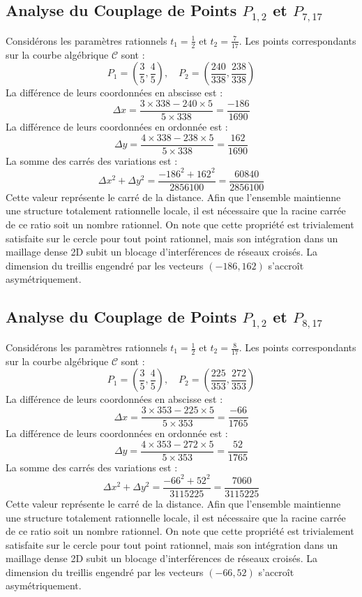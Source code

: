 \documentclass[12pt, a4paper]{article}
\begin{document}
\subsection{Analyse du Couplage de Points $P_{1,2}$ et $P_{7,17}$}
Considérons les paramètres rationnels $t_1 = \frac{1}{2}$ et $t_2 = \frac{7}{17}$.
Les points correspondants sur la courbe algébrique $\mathcal{C}$ sont :
$$ P_1 = \left( \frac{3}{5}, \frac{4}{5} \right), \quad P_2 = \left( \frac{240}{338}, \frac{238}{338} \right) $$
La différence de leurs coordonnées en abscisse est :
$$ \Delta x = \frac{3 \times 338 - 240 \times 5}{5 \times 338} = \frac{-186}{1690} $$
La différence de leurs coordonnées en ordonnée est :
$$ \Delta y = \frac{4 \times 338 - 238 \times 5}{5 \times 338} = \frac{162}{1690} $$
La somme des carrés des variations est :
$$ \Delta x^2 + \Delta y^2 = \frac{ -186^2 + 162^2 }{ 2856100 } = \frac{ 60840 }{ 2856100 } $$
Cette valeur représente le carré de la distance. Afin que l'ensemble maintienne une structure totalement rationnelle locale, il est nécessaire que la racine carrée de ce ratio soit un nombre rationnel. On note que cette propriété est trivialement satisfaite sur le cercle pour tout point rationnel, mais son intégration dans un maillage dense 2D subit un blocage d'interférences de réseaux croisés. La dimension du treillis engendré par les vecteurs $( -186, 162 )$ s'accroît asymétriquement.


\subsection{Analyse du Couplage de Points $P_{1,2}$ et $P_{8,17}$}
Considérons les paramètres rationnels $t_1 = \frac{1}{2}$ et $t_2 = \frac{8}{17}$.
Les points correspondants sur la courbe algébrique $\mathcal{C}$ sont :
$$ P_1 = \left( \frac{3}{5}, \frac{4}{5} \right), \quad P_2 = \left( \frac{225}{353}, \frac{272}{353} \right) $$
La différence de leurs coordonnées en abscisse est :
$$ \Delta x = \frac{3 \times 353 - 225 \times 5}{5 \times 353} = \frac{-66}{1765} $$
La différence de leurs coordonnées en ordonnée est :
$$ \Delta y = \frac{4 \times 353 - 272 \times 5}{5 \times 353} = \frac{52}{1765} $$
La somme des carrés des variations est :
$$ \Delta x^2 + \Delta y^2 = \frac{ -66^2 + 52^2 }{ 3115225 } = \frac{ 7060 }{ 3115225 } $$
Cette valeur représente le carré de la distance. Afin que l'ensemble maintienne une structure totalement rationnelle locale, il est nécessaire que la racine carrée de ce ratio soit un nombre rationnel. On note que cette propriété est trivialement satisfaite sur le cercle pour tout point rationnel, mais son intégration dans un maillage dense 2D subit un blocage d'interférences de réseaux croisés. La dimension du treillis engendré par les vecteurs $( -66, 52 )$ s'accroît asymétriquement.
\end{document}
